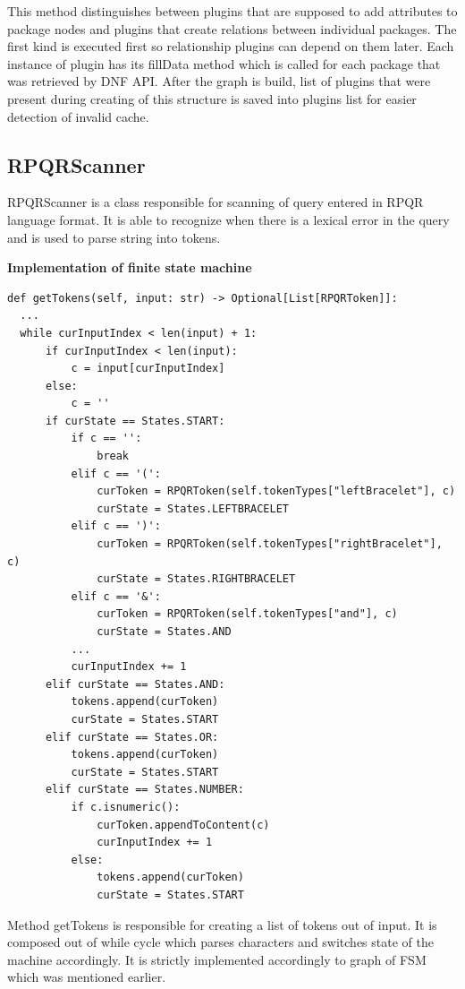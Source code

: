 This method distinguishes between plugins that are supposed to add attributes to package nodes and
plugins that create relations between individual packages. The first kind is executed first so
relationship plugins can depend on them later. Each instance of plugin has its fillData method
which is called for each package that was retrieved by DNF API. After the graph is build, list
of plugins that were present during creating of this structure is saved into plugins list for easier
detection of invalid cache.

\subsection*{RPQRScanner}
RPQRScanner is a class responsible for scanning of query entered in RPQR language format. It is able
to recognize when there is a lexical error in the query and is used to parse string into tokens.

\textbf{Implementation of finite state machine}

\begin{lstlisting}
def getTokens(self, input: str) -> Optional[List[RPQRToken]]:
  ...
  while curInputIndex < len(input) + 1:
      if curInputIndex < len(input):
          c = input[curInputIndex]
      else:
          c = ''
      if curState == States.START:
          if c == '':
              break
          elif c == '(':
              curToken = RPQRToken(self.tokenTypes["leftBracelet"], c)
              curState = States.LEFTBRACELET
          elif c == ')':
              curToken = RPQRToken(self.tokenTypes["rightBracelet"], c)
              curState = States.RIGHTBRACELET
          elif c == '&':
              curToken = RPQRToken(self.tokenTypes["and"], c)
              curState = States.AND
          ...
          curInputIndex += 1
      elif curState == States.AND:
          tokens.append(curToken)
          curState = States.START
      elif curState == States.OR:
          tokens.append(curToken)
          curState = States.START
      elif curState == States.NUMBER:
          if c.isnumeric():
              curToken.appendToContent(c)
              curInputIndex += 1
          else:
              tokens.append(curToken)
              curState = States.START
\end{lstlisting}

Method getTokens is responsible for creating a list of tokens out of input. It is composed out of
while cycle which parses characters and switches state of the machine accordingly. It is strictly
implemented accordingly to graph of FSM which was mentioned earlier.

